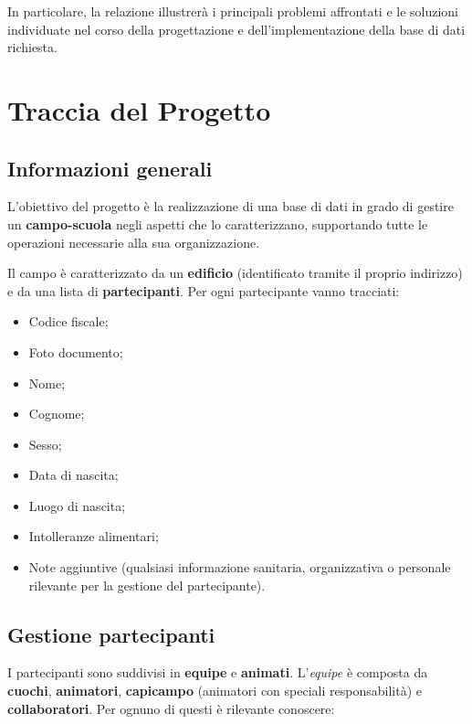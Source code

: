 \documentclass[11pt,a4paper]{article}
\begin{document}
In particolare, la relazione illustrerà i principali problemi affrontati e le soluzioni individuate
nel corso della progettazione e dell'implementazione della base di dati richiesta.


\section{Traccia del Progetto}

\subsection{Informazioni generali}

L'obiettivo del progetto è la realizzazione di una base di dati in grado di gestire un
\textbf{campo-scuola} negli aspetti che lo caratterizzano, supportando tutte le operazioni
necessarie alla sua organizzazione.

Il campo è caratterizzato da un \textbf{edificio} (identificato tramite il proprio indirizzo) e da
una lista di \textbf{partecipanti}. Per ogni partecipante vanno tracciati:

\begin{itemize}[nosep]
  \item Codice fiscale;
  \item Foto documento;
  \item Nome;
  \item Cognome;
  \item Sesso;
  \item Data di nascita;
  \item Luogo di nascita;
  \item Intolleranze alimentari;
  \item Note aggiuntive (qualsiasi informazione sanitaria, organizzativa o personale rilevante
    per la gestione del partecipante).
\end{itemize}

\subsection{Gestione partecipanti}

I partecipanti sono suddivisi in \textbf{equipe} e \textbf{animati}. L'\textit{equipe} è composta
da \textbf{cuochi}, \textbf{animatori}, \textbf{capicampo} (animatori con speciali
responsabilità) e \textbf{collaboratori}. Per ognuno di questi è rilevante conoscere:
\end{document}
